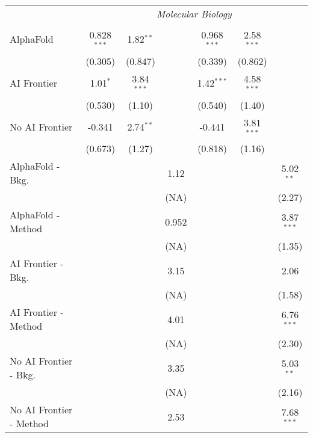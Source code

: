 \begin{tabular}{lcccccc}
 & \multicolumn{6}{c}{\textit{Molecular Biology}} \\ \\
   AlphaFold               & 0.828$^{***}$ & 1.82$^{**}$  &       & 0.968$^{***}$ & 2.58$^{***}$ &   \\   
                           & (0.305)       & (0.847)      &       & (0.339)       & (0.862)      &   \\   
   AI Frontier             & 1.01$^{*}$    & 3.84$^{***}$ &       & 1.42$^{***}$  & 4.58$^{***}$ &   \\   
                           & (0.530)       & (1.10)       &       & (0.540)       & (1.40)       &   \\   
   No AI Frontier          & -0.341        & 2.74$^{**}$  &       & -0.441        & 3.81$^{***}$ &   \\   
                           & (0.673)       & (1.27)       &       & (0.818)       & (1.16)       &   \\   
   AlphaFold - Bkg.        &               &              & 1.12  &               &              & 5.02$^{**}$\\   
                           &               &              & (NA)  &               &              & (2.27)\\   
   AlphaFold - Method      &               &              & 0.952 &               &              & 3.87$^{***}$\\   
                           &               &              & (NA)  &               &              & (1.35)\\   
   AI Frontier - Bkg.      &               &              & 3.15  &               &              & 2.06\\   
                           &               &              & (NA)  &               &              & (1.58)\\   
   AI Frontier - Method    &               &              & 4.01  &               &              & 6.76$^{***}$\\   
                           &               &              & (NA)  &               &              & (2.30)\\   
   No AI Frontier - Bkg.   &               &              & 3.35  &               &              & 5.03$^{**}$\\   
                           &               &              & (NA)  &               &              & (2.16)\\   
   No AI Frontier - Method &               &              & 2.53  &               &              & 7.68$^{***}$\\   

\end{tabular}
